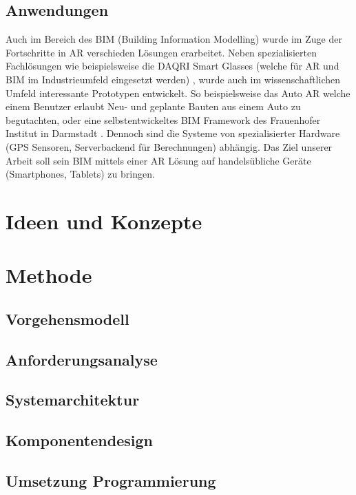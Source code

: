 \documentclass[a4paper]{scrreprt}
\begin{document}
\section{Anwendungen}

Auch im Bereich des BIM (Building Information Modelling) wurde im Zuge der Fortschritte in AR verschieden Lösungen erarbeitet. Neben spezialisierten Fachlösungen wie beispielsweise die DAQRI Smart Glasses (welche für AR und BIM im Industrieumfeld eingesetzt werden) \parencite{DAQRI2018}, wurde auch im wissenschaftlichen Umfeld interessante Prototypen entwickelt. So beispielsweise das Auto AR \parencite{Opperman2015} welche einem Benutzer erlaubt Neu- und geplante Bauten aus einem Auto zu begutachten, oder eine selbstentwickeltes BIM Framework des Frauenhofer Institut in Darmstadt \parencite{Olbrich2013}. Dennoch sind die Systeme von spezialisierter Hardware (GPS Sensoren, Serverbackend für Berechnungen) abhängig. Das Ziel unserer Arbeit soll sein BIM mittels einer AR Lösung auf handelsübliche Geräte (Smartphones, Tablets) zu bringen.

\chapter{Ideen und Konzepte}

\chapter{Methode}

\section{Vorgehensmodell}

\section{Anforderungsanalyse}

\section{Systemarchitektur}

\section{Komponentendesign}

\section{Umsetzung Programmierung}
\end{document}
